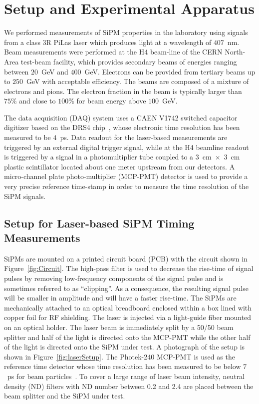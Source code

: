 \section{Setup and Experimental Apparatus }
\label{sec:setup}

We performed measurements of SiPM properties in the laboratory using
signals from a class 3R PiLas laser which produces light at a wavelength of
$407$~nm. Beam measurements were performed at the H4 beam-line of the CERN
North-Area test-beam facility, which provides secondary beams of energies
ranging between $20$~GeV and $400$~GeV. Electrons can be provided from tertiary beams up to 
$250$~GeV with acceptable efficiency. The beams are composed of a mixture of
electrons and pions. The electron fraction in the beam is typically larger than 
$75\%$ and close to $100\%$ for beam energy above $100$~GeV.

The data acquisition (DAQ) system uses a CAEN V1742 switched capacitor digitizer
based on the DRS4 chip~\cite{DRS4}, whose electronic time resolution has been
measured to be $4$~ps. Data readout for the laser-based measurements are
triggered by an external digital trigger signal, while at the H4 beamline
readout is triggered by a signal in a photomultiplier tube coupled to a
$3$~$\mathrm{cm}$~$\times$~$3$~$\mathrm{cm}$ plastic scintillator located about
one meter upstream from our detectors. A micro-channel plate photo-multiplier
(MCP-PMT) detector is used to provide a very precise reference time-stamp in
order to measure the time resolution of the SiPM signals.

\subsection{Setup for Laser-based SiPM Timing Measurements}

SiPMs are mounted on a printed circuit board (PCB) with the circuit shown in
Figure~\ref{fig:Circuit}. The high-pass filter is used to decrease the rise-time
of signal pulses by removing low-frequency components of the signal pulse and is
sometimes referred to as ``clipping''. As a consequence, the resulting signal
pulse will be smaller in amplitude and will have a faster rise-time. The SiPMs
are mechanically attached to an optical breadboard enclosed within a box lined
with copper foil for RF shielding. The laser is injected via a light-guide fiber
mounted on an optical holder. The laser beam is immediately split by a 50/50
beam splitter and half of the light is directed onto the MCP-PMT while the other
half of the light is directed onto the SiPM under test. A photograph of the
setup is shown in Figure~\ref{fig:laserSetup}. The Photek-240 MCP-PMT is used as
the reference time detector whose time resolution has been measured to be below
$7$~ps for beam particles~\cite{MCPShowerMaxPaper}. To cover a large range of
laser beam intensity, neutral density (ND) filters with ND number between 0.2
and 2.4 are placed between the beam splitter and the SiPM under test.


